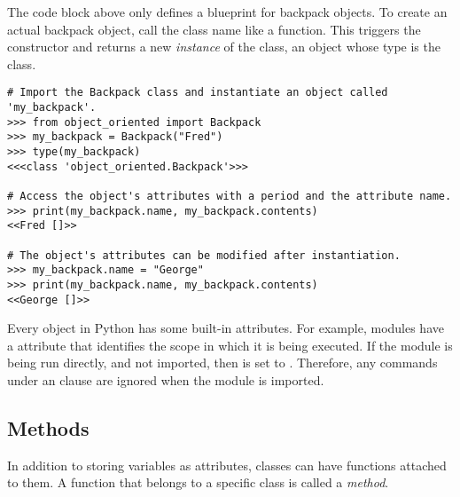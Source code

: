 The  code block above only defines a blueprint for backpack objects.
To create an actual backpack object, call the class name like a function.
This triggers the constructor and returns a new \emph{instance} of the class, an object whose type is the class.

\begin{lstlisting}
# Import the Backpack class and instantiate an object called 'my_backpack'.
>>> from object_oriented import Backpack
>>> my_backpack = Backpack("Fred")
>>> type(my_backpack)
<<<class 'object_oriented.Backpack'>>>

# Access the object's attributes with a period and the attribute name.
>>> print(my_backpack.name, my_backpack.contents)
<<Fred []>>

# The object's attributes can be modified after instantiation.
>>> my_backpack.name = "George"
>>> print(my_backpack.name, my_backpack.contents)
<<George []>>
\end{lstlisting}

\begin{info} %
Every object in Python has some built-in attributes.
For example, modules have a  attribute that identifies the scope in which it is being executed.
If the module is being run directly, and not imported, then  is set to .
Therefore, any commands under an  clause are ignored when the module is imported.
%
%
\end{info}

\subsection*{Methods} %

In addition to storing variables as attributes, classes can have functions attached to them.
A function that belongs to a specific class is called a \emph{method}.

